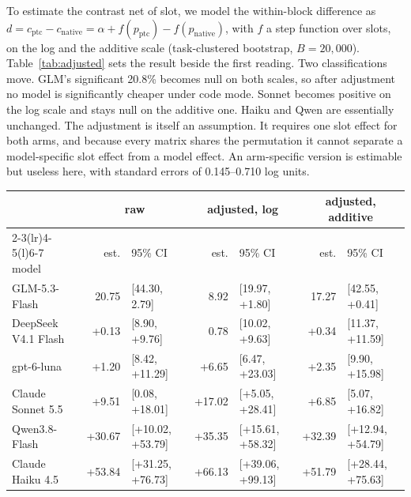 \documentclass[10pt]{article}
\newcommand*{\mi}{\textminus}   %
\newenvironment{inlinetable}{\par\medskip\noindent\begin{minipage}{\linewidth}\centering\small}{\end{minipage}\par\bigskip}
\begin{document}
To estimate the contrast net of slot, we model the within-block difference as
$d = c_{\text{ptc}} - c_{\text{native}} = \alpha + f(p_{\text{ptc}}) - f(p_{\text{native}})$, with $f$ a
step function over slots, on the log and the additive scale (task-clustered bootstrap,
$B = 20{,}000$). Table~\ref{tab:adjusted} sets the result beside the first reading. Two
classifications move. GLM's significant \mi{}20.8\% becomes null on both scales, so after adjustment no
model is significantly cheaper under code mode. Sonnet becomes positive on the log scale and stays
null on the additive one. Haiku and Qwen are essentially unchanged. The adjustment is itself an
assumption. It requires one slot effect for both arms, and because every matrix shares the
permutation it cannot separate a model-specific slot effect from a model effect. An arm-specific
version is estimable but useless here, with standard errors of 0.145--0.710 log units.

\begin{inlinetable}
\label{tab:adjusted}
\setlength{\tabcolsep}{3pt}
\begin{tabular}{@{}lrlrlrl@{}}
\toprule
 & \multicolumn{2}{c}{raw} & \multicolumn{2}{c}{adjusted, log} & \multicolumn{2}{c}{adjusted, additive} \\
\cmidrule(lr){2-3}\cmidrule(lr){4-5}\cmidrule(l){6-7}
model & est. & 95\% CI & est. & 95\% CI & est. & 95\% CI \\
\midrule
GLM-5.3-Flash & \mi{}20.75 & [\mi{}44.30, \mi{}2.79] & \mi{}8.92 & [\mi{}19.97, +1.80] & \mi{}17.27 & [\mi{}42.55, +0.41] \\
DeepSeek V4.1 Flash & +0.13 & [\mi{}8.90, +9.76] & \mi{}0.78 & [\mi{}10.02, +9.63] & +0.34 & [\mi{}11.37, +11.59] \\
gpt-6-luna & +1.20 & [\mi{}8.42, +11.29] & +6.65 & [\mi{}6.47, +23.03] & +2.35 & [\mi{}9.90, +15.98] \\
Claude Sonnet 5.5 & +9.51 & [\mi{}0.08, +18.01] & +17.02 & [+5.05, +28.41] & +6.85 & [\mi{}5.07, +16.82] \\
Qwen3.8-Flash & +30.67 & [+10.02, +53.79] & +35.35 & [+15.61, +58.32] & +32.39 & [+12.94, +54.79] \\
Claude Haiku 4.5 & +53.84 & [+31.25, +76.73] & +66.13 & [+39.06, +99.13] & +51.79 & [+28.44, +75.63] \\
\bottomrule
\end{tabular}
\end{inlinetable}
\end{document}
